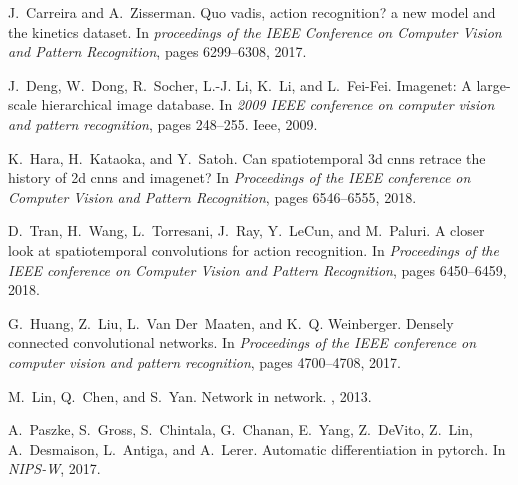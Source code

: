 \documentclass[10pt,twocolumn,letterpaper]{article}
\begin{document}
{\begin{thebibliography}{10}
J.~Carreira and A.~Zisserman.
\newblock Quo vadis, action recognition? a new model and the kinetics dataset.
\newblock In {\em proceedings of the IEEE Conference on Computer Vision and
	Pattern Recognition}, pages 6299--6308, 2017.

J.~Deng, W.~Dong, R.~Socher, L.-J. Li, K.~Li, and L.~Fei-Fei.
\newblock Imagenet: A large-scale hierarchical image database.
\newblock In {\em 2009 IEEE conference on computer vision and pattern
	recognition}, pages 248--255. Ieee, 2009.

K.~Hara, H.~Kataoka, and Y.~Satoh.
\newblock Can spatiotemporal 3d cnns retrace the history of 2d cnns and
	imagenet?
\newblock In {\em Proceedings of the IEEE conference on Computer Vision and
	Pattern Recognition}, pages 6546--6555, 2018.

D.~Tran, H.~Wang, L.~Torresani, J.~Ray, Y.~LeCun, and M.~Paluri.
\newblock A closer look at spatiotemporal convolutions for action recognition.
\newblock In {\em Proceedings of the IEEE conference on Computer Vision and
	Pattern Recognition}, pages 6450--6459, 2018.

G.~Huang, Z.~Liu, L.~Van Der~Maaten, and K.~Q. Weinberger.
\newblock Densely connected convolutional networks.
\newblock In {\em Proceedings of the IEEE conference on computer vision and
	pattern recognition}, pages 4700--4708, 2017.

M.~Lin, Q.~Chen, and S.~Yan.
\newblock Network in network.
, 2013.

A.~Paszke, S.~Gross, S.~Chintala, G.~Chanan, E.~Yang, Z.~DeVito, Z.~Lin,
	A.~Desmaison, L.~Antiga, and A.~Lerer.
\newblock Automatic differentiation in pytorch.
\newblock In {\em NIPS-W}, 2017.

\end{thebibliography}
}
\end{document}
